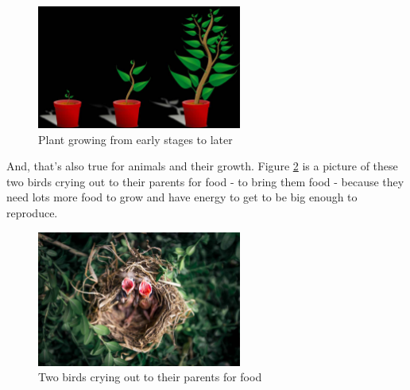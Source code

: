 \documentclass[]{article}
\begin{document}
\begin{figure}[H]
	\begin{center}
		\caption{Plant growing
			from early stages to later}\label{fig:development}
		\includegraphics[width=0.6\textwidth]{development}
	\end{center}
\end{figure}
And, that's also true
for animals and their growth.
Figure \ref{fig:animals} is a picture of these two birds
crying out to their parents for food -
to bring them food -
because they need lots more food
to grow and have energy
to get to be big enough to reproduce.
\begin{figure}[H]
	\begin{center}
		\caption{Two birds
			crying out to their parents for food}\label{fig:animals}
		\includegraphics[width=0.6\textwidth]{animals}
	\end{center}
\end{figure}
\end{document}
